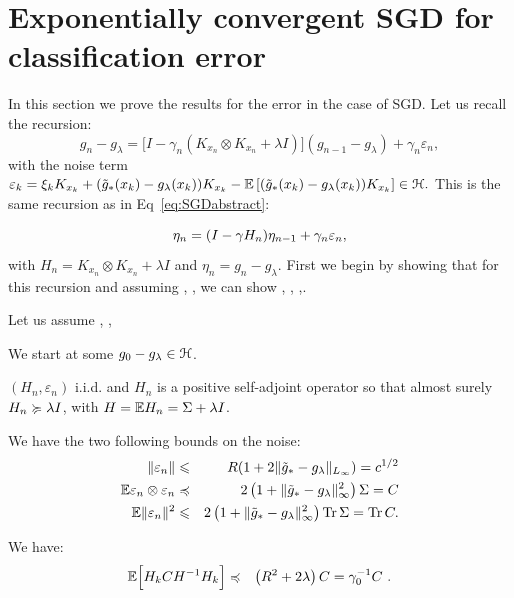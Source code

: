 \section{Exponentially convergent SGD for classification error}\label{sec:error}

In this section we prove the results for the error in the case of SGD. Let us recall the recursion:
\begin{equation*}
    {g}_n - g_\lambda =  \big[
I - \gamma_n   (  K_{x_n} \otimes K_{x_n} + \lambda I ) \big]
  ( {g}_{n-1} - g_\lambda )   + \gamma_n \varepsilon_n,
\end{equation*}
%
with the noise term $\varepsilon_k  =   \xi_k K_{x_k}   +   (\tilde{g}_*(x_k)- g_\lambda(x_k)) K_{x_k} - {\mathbb E} \left[ (\tilde{g}_*(x_k)- g_\lambda(x_k)) K_{x_k} \right] \in {\mathcal H}.$
%
This is the same recursion as in Eq~\eqref{eq:SGDabstract}:

\begin{equation*}
\eta_n = ( I - \gamma H_n) \eta_{n-1} + \gamma_n \varepsilon_n,
\end{equation*}
%
with $H_n =  K_{x_n} \otimes K_{x_n} + \lambda I$ and $\eta_n = g_n - g_\lambda$.
%
First we begin by showing that for this recursion and assuming , , we can show , , ,.

\begin{lemma}
\label{le:noise}
Let us assume , ,
\BIT
\item {}  We start at some $g_0 - g_\lambda \in {\mathcal H}$.
\item {} $(H_n,\varepsilon_n)$ i.i.d. and $H_n$ is a positive self-adjoint operator so that almost surely $H_n \succcurlyeq \lambda I$, with $H  = {\mathbb E} H_n = \Sigma + \lambda I$.
\item {} We have the two following bounds on the noise:
\begin{eqnarray*}
 \| \varepsilon_n \| &\leqslant& R  ( 1 + 2 \| \tilde{g}_* - g_\lambda\|_{L_\infty} ) = c^{1/2} \\
{\mathbb E} \varepsilon_n \otimes \varepsilon_n
& \preccurlyeq & 2 \left(1+\|\tilde{g}_*- g_\lambda\|^2_\infty\right) \Sigma = C\\
{\mathbb E} \|\varepsilon_n\|^2 &\leqslant& 2 \left(1+\|\tilde{g}_*- g_\lambda\|^2_\infty\right) \operatorname{Tr} \Sigma = \operatorname{Tr} C.
\end{eqnarray*} 
\item {} We have:
\begin{eqnarray*}
{\mathbb E} \Big[ H_k C H^{-1} H_k \Big]
&  \preccurlyeq 
& \left(R^2 + 2\lambda\right) C = \gamma_0^{-1} C  \ .
\end{eqnarray*}
\EIT 
\end{lemma}

